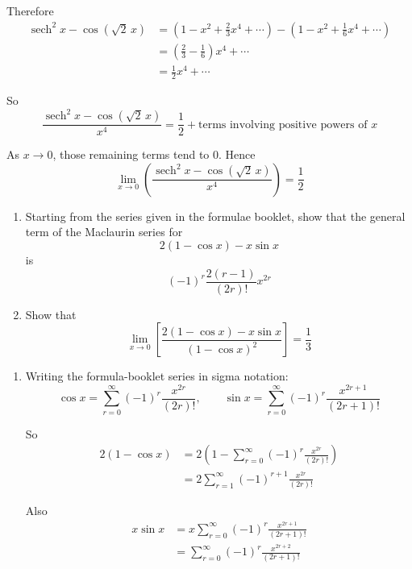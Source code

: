 \documentclass[leqno]{article}
\begin{document}
\begin{enumerate}[
  label=\textbf{\arabic*.},
  leftmargin=*,
  topsep=0pt,
  partopsep=0pt,
  parsep=0pt
]
\begin{djsSolution}
\begin{enumerate}[label=\textbf{(\alph*)}]
  Therefore
  \begin{align*}
  \operatorname{sech}^2x-\cos(\sqrt{2}\,x)
  &= \left(1-x^2+\frac{2}{3}x^4+\cdots\right)-\left(1-x^2+\frac{1}{6}x^4+\cdots\right) \\
  &= \left(\frac{2}{3}-\frac{1}{6}\right)x^4+\cdots \\
  &= \frac{1}{2}x^4+\cdots
  \end{align*}

  So
  \[
  \frac{\operatorname{sech}^2x-\cos(\sqrt{2}\,x)}{x^4}
  = \frac{1}{2}+\text{terms involving positive powers of }x
  \]

  As \(x\to 0\), those remaining terms tend to \(0\). Hence
  \[
  \lim_{x\to 0}\left(\frac{\operatorname{sech}^2 x-\cos(\sqrt{2}\,x)}{x^4}\right)=\frac{1}{2}
  \]
\end{enumerate}
\end{djsSolution}


\newpage

\questionitem

\begin{enumerate}[label=\textbf{(\alph*)}]
  \item Starting from the series given in the formulae booklet, show that the general term of the Maclaurin series for
  \[
  2(1-\cos x)-x\sin x
  \]
  is
  \[
  (-1)^r\frac{2(r-1)}{(2r)!}x^{2r}
  \]
  \item Show that
  \[
  \lim_{x\to 0}\left[\frac{2(1-\cos x)-x\sin x}{(1-\cos x)^2}\right]=\frac{1}{3}
  \]
\end{enumerate}

\vspace*{10pt}

\begin{djsSolution}
\begin{enumerate}[label=\textbf{(\alph*)}]
  \item Writing the formula-booklet series in sigma notation:
\[
\cos x=\sum_{r=0}^{\infty}(-1)^r\frac{x^{2r}}{(2r)!},
\qquad
\sin x=\sum_{r=0}^{\infty}(-1)^r\frac{x^{2r+1}}{(2r+1)!}
\]

So
\begin{align*}
2(1-\cos x)
&=2\left(1-\sum_{r=0}^{\infty}(-1)^r\frac{x^{2r}}{(2r)!}\right)\\
&=2\sum_{r=1}^{\infty}(-1)^{r+1}\frac{x^{2r}}{(2r)!}
\end{align*}

Also
\begin{align*}
x\sin x
&=x\sum_{r=0}^{\infty}(-1)^r\frac{x^{2r+1}}{(2r+1)!}\\
&=\sum_{r=0}^{\infty}(-1)^r\frac{x^{2r+2}}{(2r+1)!}
\end{align*}


\end{enumerate}
\end{djsSolution}
\end{enumerate}
\end{document}
